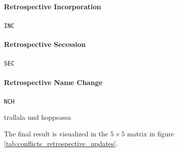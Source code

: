 
\paragraph{Retrospective Incorporation} %
\label{par:retrospective_incorporation}
\texttt{INC}


\paragraph{Retrospective Secession} %
\label{par:retrospective_secession}
\texttt{SEC}


\paragraph{Retrospective Name Change} %
\label{par:retrospective_name_change}
\texttt{NCH}

trallala und hoppsassa


\vspace{1em}
The final result is visualized in the $5 \times 5$ matrix in figure \ref{tab:conflicts_retrospective_updates}.

